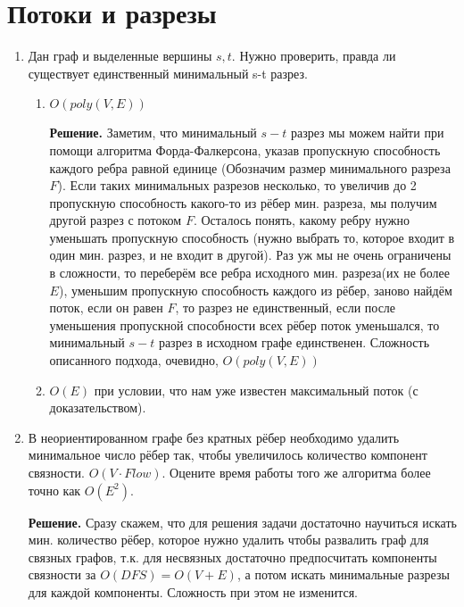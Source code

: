 \section*{Потоки и разрезы}
\begin{enumerate}
	\item Дан граф и выделенные вершины $s, t$. Нужно проверить, правда ли существует единственный минимальный s-t разрез.
	\begin{enumerate}
		\item $O(poly(V, E))$
		
		\textbf{Решение.} Заметим, что минимальный $s-t$ разрез мы можем найти при помощи алгоритма 
		Форда-Фалкерсона, указав пропускную способность каждого ребра равной единице (Обозначим размер 
		минимального разреза $F$). Если таких минимальных разрезов несколько, то увеличив до 2 пропускную 
		способность какого-то из рёбер мин. разреза, мы получим другой разрез с потоком $F$. Осталось понять, 
		какому ребру нужно уменьшать пропускную способность (нужно выбрать то, которое входит в один мин. разрез, 
		и не входит в другой). Раз уж мы не очень ограничены в сложности, то переберём все ребра исходного мин. 
		разреза(их не более $E$), уменьшим пропускную способность каждого из рёбер, заново найдём поток, если он 
		равен $F$, то разрез не единственный, если после уменьшения пропускной способности всех рёбер поток 
		уменьшался, то 
		минимальный $s-t$ разрез в исходном графе единственен. Сложность описанного подхода, очевидно, $O(poly(V, E))$
		\item $O(E)$ при условии, что нам уже известен максимальный поток (с доказательством).
	\end{enumerate}
	
	\item В неориентированном графе без кратных рёбер необходимо удалить минимальное число рёбер так, чтобы 
	увеличилось количество компонент связности. $O(V \cdot Flow)$. Оцените время работы	того же алгоритма более 
	точно как $O(E^2)$.
	
	
	\textbf{Решение.} Сразу скажем, что для решения задачи достаточно научиться искать мин. количество рёбер, 
	которое нужно удалить чтобы развалить граф для связных графов, т.к. для несвязных достаточно предпосчитать 
	компоненты связности за $O(DFS) = O(V + E)$, а потом искать минимальные разрезы для каждой компоненты. 
	Сложность при этом не изменится.
	

\end{enumerate}
